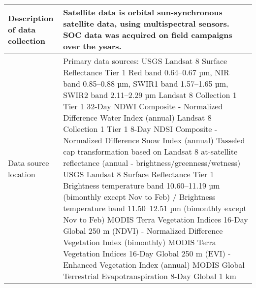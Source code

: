 \documentclass[times,final]{elsarticle}
\begin{document}
{\begin{longtable}{|p{33mm}|p{94mm}|}
\hline
Description of          
data\newline 
collection             & Satellite data is orbital sun-synchronous satellite data,                          using multispectral sensors. SOC data was acquired on field                          campaigns over the years. \\
\hline                         
Data source location   & Primary data sources:  \newline
                        \newline
                        USGS Landsat 8 Surface Reflectance Tier 1
                        Red band 0.64–0.67 µm, NIR band 0.85–0.88 µm,
                        SWIR1 band 1.57–1.65 µm, SWIR2 band 2.11–2.29 µm \newline 
                        \newline
                        Landsat 8 Collection 1 Tier 1 32-Day NDWI Composite - Normalized Difference Water Index (annual)
                        \newline \newline
                        Landsat 8 Collection 1 Tier 1 8-Day NDSI Composite - Normalized Difference Snow Index (annual)
                        \newline \newline
                        Tasseled cap transformation based on Landsat 8 at-satellite reflectance (annual - brightness/greenness/wetness)
                        \newline \newline
                    	USGS Landsat 8 Surface Reflectance Tier 1
                        Brightness temperature band 10.60–11.19 µm (bimonthly except Nov to Feb) / 
                       Brightness temperature band 11.50–12.51 µm (bimonthly except Nov to Feb)
                        \newline\newline
                        MODIS Terra Vegetation Indices 16-Day Global 250 m (NDVI) - Normalized Difference Vegetation Index (bimonthly)
                        \newline \newline
                    	MODIS Terra Vegetation Indices 16-Day Global 250 m (EVI) - Enhanced Vegetation Index (annual)
                    	\newline \newline
                    	MODIS Global Terrestrial Evapotranspiration 8-Day Global 1 km
                    	\newline \newline

\end{longtable}}
\end{document}
